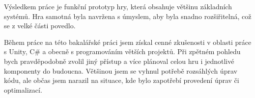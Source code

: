 Výsledkem práce je funkční prototyp hry, která obsahuje většinu základních systémů. Hra samotná byla navržena s úmyslem, aby byla snadno rozšiřitelná, což se z velké části povedlo.

Během práce na této bakalářské práci jsem získal cenné zkušenosti v oblasti práce s Unity, C\# a obecně s programováním větších projektů. Při zpětném pohledu bych pravděpodobně zvolil jiný přístup a více plánoval celou hru i jednotlivé komponenty do budoucna. Většinou jsem se vyhnul potřebě rozsáhlých úprav kódu, ale občas jsem narazil na situace, kde bylo zapotřebí provedení úprav či optimalizací.

